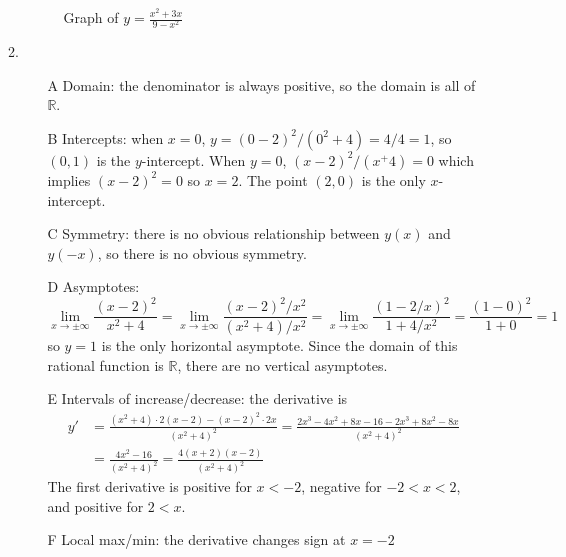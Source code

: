 \documentclass{article}
\newcommand{\ds}{\displaystyle}
\begin{document}
\begin{enumerate}
\begin{enumerate}
\begin{figure}[htbp]
      \caption{Graph of $\ds y=\frac{x^2+3x}{9-x^2}$}
      \label{fig:x2+3xover9-x2}
    \end{figure}
  \item %
    \begin{itemize}
    \item[A] Domain: the denominator is always positive, so the domain
      is all of $\mathbb{R}$.
    \item[B] Intercepts: when $x=0$, $y=(0-2)^2/(0^2+4)=4/4=1$, so
      $(0,1)$ is the $y$-intercept.  When $y=0$, $(x-2)^2/(x^+4)=0$
      which implies $(x-2)^2=0$ so $x=2$.  The point $(2,0)$ is the
      only $x$-intercept.
    \item[C] Symmetry: there is no obvious relationship between $y(x)$
      and $y(-x)$, so there is no obvious symmetry.
    \item[D] Asymptotes:
      \begin{displaymath}
        \lim_{x\to\pm\infty} \frac{(x-2)^2}{x^2+4}
        = \lim_{x\to\pm\infty} \frac{(x-2)^2/x^2}{(x^2+4)/x^2}
        = \lim_{x\to\pm\infty} \frac{(1-2/x)^2}{1+4/x^2}
        = \frac{(1-0)^2}{1+0} = 1
      \end{displaymath}
      so $y=1$ is the only horizontal asymptote.  Since the domain of
      this rational function is $\mathbb{R}$, there are no vertical
      asymptotes.
    \item[E] Intervals of increase/decrease: the derivative is
      \begin{align*}
        y' &= \frac{(x^2+4)\cdot 2(x-2) - (x-2)^2\cdot 2x}{(x^2+4)^2}
        = \frac{2x^3-4x^2+8x-16-2x^3+8x^2-8x}{(x^2+4)^2} \\
        &= \frac{4x^2-16}{(x^2+4)^2} = \frac{4(x+2)(x-2)}{(x^2+4)^2}
      \end{align*}
      The first derivative is positive for $x<-2$, negative for
      $-2<x<2$, and positive for $2<x$.
    \item[F] Local max/min: the derivative changes sign at $x=-2$

\end{itemize}
\end{enumerate}
\end{enumerate}
\end{document}
